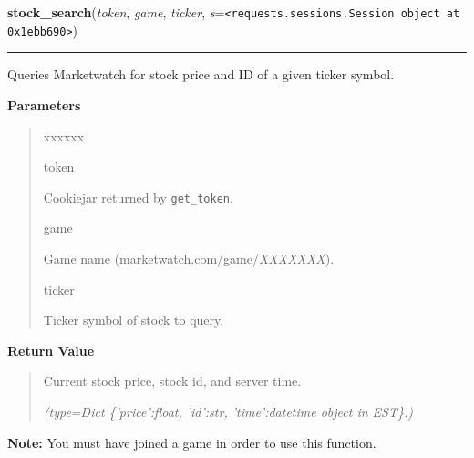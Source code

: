     \label{moira:stock_search}

    \vspace{0.5ex}

\hspace{.8\funcindent}\begin{boxedminipage}{\funcwidth}

    \raggedright \textbf{stock\_search}(\textit{token}, \textit{game}, \textit{ticker}, \textit{s}={\tt {\textless}requests.sessions.Session object at 0x1ebb690{\textgreater}})

    \vspace{-1.5ex}

    \rule{\textwidth}{0.5\fboxrule}
\setlength{\parskip}{2ex}
    Queries Marketwatch for stock price and ID of a given ticker symbol.

\setlength{\parskip}{1ex}
      \textbf{Parameters}
      \vspace{-1ex}

      \begin{quote}
        \begin{Ventry}{xxxxxx}

          \item[token]

          Cookiejar returned by \texttt{get\_token}.

          \item[game]

          Game name (marketwatch.com/game/\textit{XXXXXXX}).

          \item[ticker]

          Ticker symbol of stock to query.

        \end{Ventry}

      \end{quote}

      \textbf{Return Value}
    \vspace{-1ex}

      \begin{quote}
      Current stock price, stock id, and server time.

      {\it (type=Dict \{'price':float, 'id':str, 'time':\textit{datetime} object in 
      EST\}.)}

      \end{quote}

\textbf{Note:} You must have joined a game in order to use this function.



    \end{boxedminipage}


